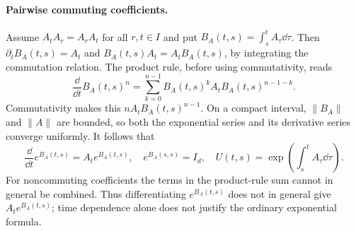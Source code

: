 \documentclass[12pt,a4paper,oneside]{book}
\begin{document}
\paragraph{Pairwise commuting coefficients.}
Assume $A_tA_r=A_rA_t$ for all $r,t\in I$ and put
$B_A(t,s)=\int_s^t A_\tau\dd\tau$. Then $\partial_t B_A(t,s)=A_t$ and
$B_A(t,s)A_t=A_tB_A(t,s)$, by integrating the commutation relation.
The product rule, before using commutativity, reads
\begin{equation*}
\frac{\dd}{\dd t}B_A(t,s)^n
 =\sum_{k=0}^{n-1}B_A(t,s)^k A_tB_A(t,s)^{n-1-k}.
\end{equation*}
Commutativity makes this $nA_tB_A(t,s)^{n-1}$. On a compact
interval, $\|B_A\|$ and $\|A\|$ are bounded, so both the
exponential series and its derivative series converge uniformly.
It follows that
\begin{equation*}
\frac{\dd}{\dd t}e^{B_A(t,s)}=A_te^{B_A(t,s)},\quad e^{B_A(s,s)}=I_d,
 \quad U(t,s)=\exp\left(\int_s^t A_\tau\dd\tau\right).
\end{equation*}
For noncommuting coefficients the terms in the product-rule sum
cannot in general be combined. Thus differentiating $e^{B_A(t,s)}$
does not in general give $A_te^{B_A(t,s)}$; time dependence alone
does not justify the ordinary exponential formula.
\end{document}

